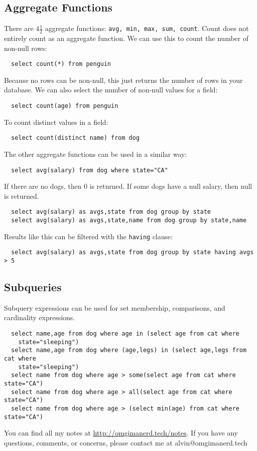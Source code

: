 \documentclass{math}
\begin{document}
\subsection*{Aggregate Functions}
There are \( 4\frac{1}{2} \) aggregate functions: \texttt{avg, min, max, sum,
count}. Count does not entirely count as an aggregate function. We can use
this to count the number of non-null rows:
\begin{lstlisting}
  select count(*) from penguin
\end{lstlisting}
Because no rows can be non-null, this just returns the number of rows in your
database. We can also select the number of non-null values for a field:
\begin{lstlisting}
  select count(age) from penguin
\end{lstlisting}
To count distinct values in a field:
\begin{lstlisting}
  select count(distinct name) from dog
\end{lstlisting}
The other aggregate functions can be used in a similar way:
\begin{lstlisting}
  select avg(salary) from dog where state="CA"
\end{lstlisting}
If there are no dogs, then 0 is returned. If some dogs have a null salary, then
null is returned.
\begin{lstlisting}
  select avg(salary) as avgs,state from dog group by state
  select avg(salary) as avgs,state,name from dog group by state,name
\end{lstlisting}
Results like this can be filtered with the \texttt{having} clause:
\begin{lstlisting}
  select avg(salary) as avgs,state from dog group by state having avgs > 5
\end{lstlisting}

\subsection*{Subqueries}
Subquery expressions can be used for set membership, comparisons, and
cardinality expressions.
\begin{lstlisting}
  select name,age from dog where age in (select age from cat where
    state="sleeping")
  select name,age from dog where (age,legs) in (select age,legs from cat where
    state="sleeping")
  select name from dog where age > some(select age from cat where state="CA")
  select name from dog where age > all(select age from cat where state="CA")
  select name from dog where age > (select min(age) from cat where state="CA")
\end{lstlisting}

\begin{center}
  You can find all my notes at \url{http://omgimanerd.tech/notes}. If you have
  any questions, comments, or concerns, please contact me at
  alvin@omgimanerd.tech
\end{center}
\end{document}
